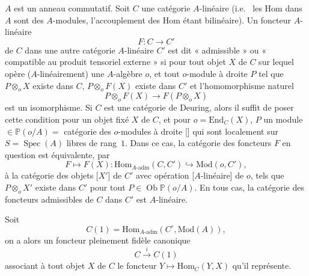 \documentclass[11pt,a4paper]{article}
\begin{document}
$A$ est un anneau commutatif. Soit $C$ une catégorie $A$-linéaire (i.e.~
les Hom dans $A$ sont des $A$-modules, l'accouplement des Hom étant
bilinéaire). Un foncteur $A$-linéaire
\[
  F : C \longrightarrow C'
\]
de $C$ dans une autre catégorie $A$-linéaire $C'$ est dit « admissible » ou
« compatible au produit tensoriel externe » si pour tout objet $X$ de $C$
sur lequel opère ($A$-linéairement) une $A$-algèbre $o$, et tout
$o$-module à droite $P$ tel que $P \otimes_{o} X$ existe dans $C$,
$P \otimes_{o} F(X)$ existe dans $C'$ et l'homomorphisme naturel
\[
  P \otimes_{o} F(X) \longrightarrow F(P \otimes_{o} X)
\]
est un isomorphisme.
Si $C$ est une catégorie de Deuring, alors il suffit de poser cette
condition pour un objet fixé $X$ de $C$, et pour $o = \mathrm{End}_{C}(X)$,
$P$ un module $\in \mathbb{P}(o/A) =$ catégorie des $o$-modules à droite
[] qui sont localement sur $S = \operatorname{Spec}(A)$
libres de rang~$1$. Dans ce cas, la catégorie des foncteurs $F$ en question
est équivalente, par
\[
  F \longmapsto F(X) : \mathrm{Hom}_{A\text{-adm}}(C, C')
  \hookrightarrow \mathrm{Mod}(o, C') ,
\]
à la catégorie des objets [$X'$] de $C'$ avec opération [$A$-linéaire] de
$o$, tels que $P \otimes_{o} X'$ existe dans $C'$ pour tout
$P \in \operatorname{Ob} \mathbb{P}(o/A)$. En tous cas, la catégorie des
foncteurs admissibles de $C$ dans $C'$ est $A$-linéaire.


Soit
\[
  C(1) = \mathrm{Hom}_{A\text{-adm}}(C^{\circ}, \mathrm{Mod}(A)) ,
\]
on a alors un foncteur pleinement fidèle canonique
\[
  C \xrightarrow{\ i\ } C(1)
\]
associant à tout objet $X$ de $C$ le foncteur
$Y \longmapsto \mathrm{Hom}_{C}(Y, X)$ qu'il représente.
\end{document}
